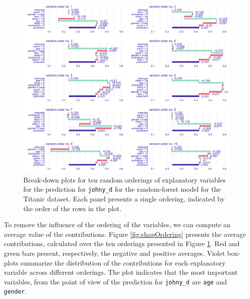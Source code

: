 \documentclass[]{krantz}
\begin{document}
\begin{figure}

{\centering \includegraphics[width=1\linewidth]{figure/shap_10_replicates} 

}

\caption{Break-down plots for ten random orderings of explanatory variables for the prediction for \texttt{johny\_d} for the random-forest model for the Titanic dataset. Each panel presents a single ordering, indicated by the order of the rows in the plot.}\label{fig:shap10orderings}
\end{figure}

To remove the influence of the ordering of the variables, we can compute an average value of the contributions.
Figure \ref{fig:shapOrdering} presents the average contributions, calculated over the ten orderings presented in Figure \ref{fig:shap10orderings}. Red and green bars present, respectively, the negative and positive averages. Violet box-plots summarize the distribution of the contributions for each explanatory variable across different orderings. The plot indicates that the most important variables, from the point of view of the prediction for \texttt{johny\_d} are \texttt{age} and \texttt{gender}.
\end{document}
